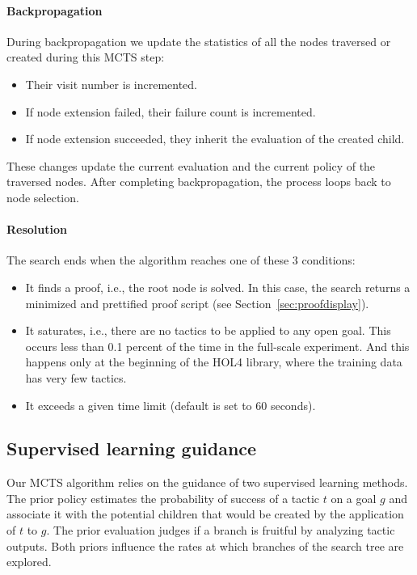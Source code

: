 \documentclass[runningheads,a4paper,draft]{svjour3}
\def\holfour{\textsf{HOL4}\xspace}
\begin{document}
\paragraph{Backpropagation}
During backpropagation we update the statistics of all the nodes traversed or
created during this MCTS step:
\begin{itemize}
\item Their visit number is incremented.
\item If node extension failed, their failure count is incremented.
\item If node extension succeeded, they inherit the evaluation of the created
child.
\end{itemize}

These changes update the current evaluation and the current policy of the
traversed nodes.
After completing backpropagation, the process loops back to node
selection.

\paragraph{Resolution}
The search ends when the algorithm reaches one of these 3 conditions:
\begin{itemize}
\item It finds a proof, i.e., the root node is solved. In this case,
the search returns a minimized and
prettified proof script (see Section~\ref{sec:proofdisplay}).
\item It saturates, i.e., there are no tactics to be applied to any open goal.
This occurs less than 0.1 percent of the time in the full-scale experiment.
And this happens only at the beginning of the \holfour library, where the 
training 
data
has very few tactics.
\item It exceeds a given time limit (default is set to 60 seconds).
\end{itemize}

\subsection{Supervised learning guidance}
Our MCTS algorithm relies on the guidance of two supervised learning methods.
The prior policy estimates the probability of success of a tactic $t$ on a 
goal $g$ and associate it with the potential children that would be created by 
the 
application of $t$ to $g$. The prior evaluation judges if a branch is fruitful 
by analyzing tactic
outputs. Both priors influence the rates at which branches of the search tree
are explored.
\end{document}
